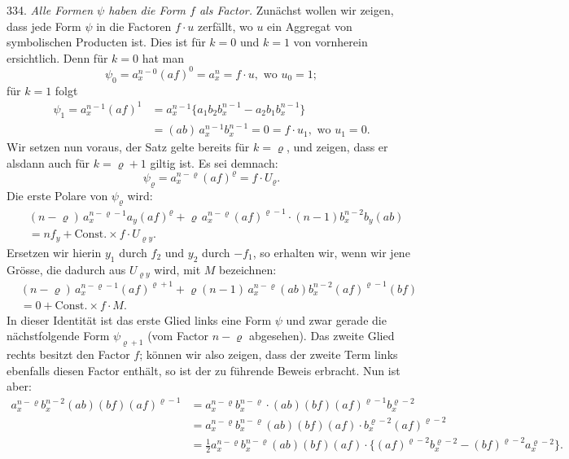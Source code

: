 \documentclass[11pt]{article}
\providecommand{\weq}[2]{\begin{equation}\tag{#1}#2\end{equation}}
\begin{document}
334. \textit{Alle Formen $\psi$ haben die Form $f$ als Factor.} Zunächst wollen wir zeigen, dass jede Form $\psi$ in die Factoren $f \cdot u$ zerfällt, wo $u$ ein Aggregat von symbolischen Producten ist. Dies ist für $k = 0$ und $k = 1$ von vornherein ersichtlich. Denn für $k = 0$ hat man
\[
\psi_0 = a_x^{n-0}(af)^0 = a_x^n = f \cdot u, \text{ wo } u_0 = 1;
\]
für $k = 1$ folgt
\[
\begin{aligned}
\psi_1 = a_x^{n-1}(af)^1 &= a_x^{n-1}\{a_1b_2b_x^{n-1} - a_2b_1b_x^{n-1}\} \\
&= (ab)\,a_x^{n-1}b_x^{n-1} = 0 = f \cdot u_1, \text{ wo } u_1 = 0.
\end{aligned}
\]
Wir setzen nun voraus, der Satz gelte bereits für $k = \varrho$, und zeigen, dass er alsdann auch für $k = \varrho + 1$ giltig ist. Es sei demnach:
\[
\psi_\varrho = a_x^{n-\varrho}(af)^\varrho = f \cdot U_\varrho.
\]
Die erste Polare von $\psi_\varrho$ wird:
\[
\begin{aligned}
&(n - \varrho)\,a_x^{n-\varrho-1}a_y(af)^\varrho + \varrho\,a_x^{n-\varrho}(af)^{\varrho-1}\cdot(n-1)b_x^{n-2}b_y(ab) \\
&= nf_y + \mathrm{Const.}\times f\cdot U_{\varrho y}.
\end{aligned}
\]
Ersetzen wir hierin $y_1$ durch $f_2$ und $y_2$ durch $-f_1$, so erhalten wir, wenn wir jene Grösse, die dadurch aus $U_{\varrho y}$ wird, mit $M$ bezeichnen:
\weq{3}{
\begin{aligned}
&(n - \varrho)\,a_x^{n-\varrho-1}(af)^{\varrho+1} + \varrho(n-1)\,a_x^{n-\varrho}(ab)b_x^{n-2}(af)^{\varrho-1}(bf) \\
&= 0 + \mathrm{Const.}\times f \cdot M.
\end{aligned}
}
In dieser Identität ist das erste Glied links eine Form $\psi$ und zwar gerade die nächstfolgende Form $\psi_{\varrho+1}$ (vom Factor $n - \varrho$ abgesehen). Das zweite Glied rechts besitzt den Factor $f$; können wir also zeigen, dass der zweite Term links ebenfalls diesen Factor enthält, so ist der zu führende Beweis erbracht. Nun ist aber:
\[
\begin{aligned}
a_x^{n-\varrho}b_x^{n-2}(ab)(bf)(af)^{\varrho-1} &= a_x^{n-\varrho}b_x^{n-\varrho}\cdot(ab)(bf)(af)^{\varrho-1}b_x^{\varrho-2} \\
&= a_x^{n-\varrho}b_x^{n-\varrho}(ab)(bf)(af)\cdot b_x^{\varrho-2}(af)^{\varrho-2} \\
&= \frac{1}{2}a_x^{n-\varrho}b_x^{n-\varrho}(ab)(bf)(af)\cdot\{(af)^{\varrho-2}b_x^{\varrho-2} - (bf)^{\varrho-2}a_x^{\varrho-2}\}.
\end{aligned}
\]
\end{document}

